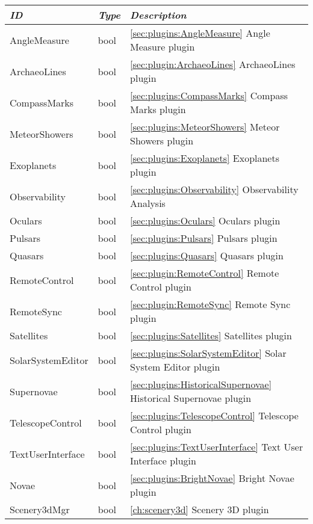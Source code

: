\begin{longtable}{l|l|p{80mm}}
\toprule
\emph{ID} & \emph{Type} & \emph{Description}\\\midrule
AngleMeasure          & bool & \ref{sec:plugins:AngleMeasure} Angle Measure plugin\\%
ArchaeoLines          & bool & \ref{sec:plugin:ArchaeoLines} ArchaeoLines plugin\\%
CompassMarks          & bool & \ref{sec:plugins:CompassMarks} Compass Marks plugin\\%
MeteorShowers         & bool & \ref{sec:plugins:MeteorShowers} Meteor Showers plugin \\%
Exoplanets            & bool & \ref{sec:plugins:Exoplanets} Exoplanets plugin \\%
Observability         & bool & \ref{sec:plugins:Observability} Observability Analysis\\%
Oculars               & bool & \ref{sec:plugins:Oculars} Oculars plugin \\%
Pulsars               & bool & \ref{sec:plugins:Pulsars} Pulsars plugin \\%
Quasars               & bool & \ref{sec:plugins:Quasars} Quasars plugin \\%
RemoteControl         & bool & \ref{sec:plugin:RemoteControl} Remote Control plugin \\%
RemoteSync            & bool & \ref{sec:plugin:RemoteSync} Remote Sync plugin \\%
Satellites            & bool & \ref{sec:plugins:Satellites} Satellites plugin \\%
SolarSystemEditor     & bool & \ref{sec:plugins:SolarSystemEditor} Solar System Editor plugin\\%
Supernovae            & bool & \ref{sec:plugins:HistoricalSupernovae} Historical Supernovae plugin \\%
TelescopeControl      & bool & \ref{sec:plugins:TelescopeControl} Telescope Control plugin \\%
TextUserInterface     & bool & \ref{sec:plugins:TextUserInterface} Text User Interface plugin \\%
Novae                 & bool & \ref{sec:plugins:BrightNovae} Bright Novae plugin \\%
Scenery3dMgr          & bool & \ref{ch:scenery3d} Scenery 3D plugin \\\bottomrule
\end{longtable}

